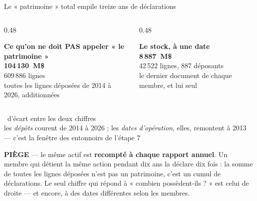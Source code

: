 \documentclass[11pt,aspectratio=169]{beamer}
\newcommand{\kpi}[3]{{\large\textbf{\textcolor{#1}{#2}}}~{\footnotesize #3}}
\newcommand{\defl}[1]{{\scriptsize\color{black!55}#1}}
\newcommand{\piege}[1]{%
  \colorbox{warnorange!12}{\parbox{\dimexpr\linewidth-8pt}{\scriptsize
    \textbf{\textcolor{warnorange}{PIÈGE}}\; --- #1}}}
\begin{document}
\begin{frame}{Le « patrimoine » total empile treize ans de déclarations}
  \footnotesize
  \begin{columns}[T]
    \begin{column}{0.48\textwidth}
      \centering
      \colorbox{alertred!8}{\parbox{\dimexpr\linewidth-8pt}{\centering\vspace{1mm}
        \textbf{\textcolor{alertred}{Ce qu'on ne doit PAS appeler « le patrimoine »}}\\[1.5mm]
        {\Large\textbf{104\,130~M\$}}\\[0.8mm]
        609\,886 lignes\\[0.8mm]
        \defl{toutes les lignes déposées de 2014 à 2026, additionnées}\vspace{1mm}}}
    \end{column}
    \begin{column}{0.48\textwidth}
      \centering
      \colorbox{okgreen!10}{\parbox{\dimexpr\linewidth-8pt}{\centering\vspace{1mm}
        \textbf{\textcolor{okgreen}{Le stock, à une date}}\\[1.5mm]
        {\Large\textbf{8\,887~M\$}}\\[0.8mm]
        42\,522 lignes, 887 déposants\\[0.8mm]
        \defl{le dernier document de chaque membre, et lui seul}\vspace{1mm}}}
    \end{column}
  \end{columns}
  \medskip
  \centering \kpi{alertred}{12×}{d'écart entre les deux chiffres}\\[1mm]
  \defl{les \emph{dépôts} courent de 2014 à 2026 ; les \emph{dates d'opération}, elles, remontent
        à 2013 --- c'est la fenêtre des entonnoirs de l'étape 7}\\[2mm]

  \raggedright
  \piege{le même actif est \textbf{recompté à chaque rapport annuel}. Un membre qui détient
    la même action pendant dix ans la déclare dix fois : la somme de toutes les lignes déposées
    n'est pas un patrimoine, c'est un cumul de déclarations. Le seul chiffre qui répond à
    « combien possèdent-ils ? » est celui de droite --- et encore, à des dates différentes selon les membres.}
\end{frame}
\end{document}
